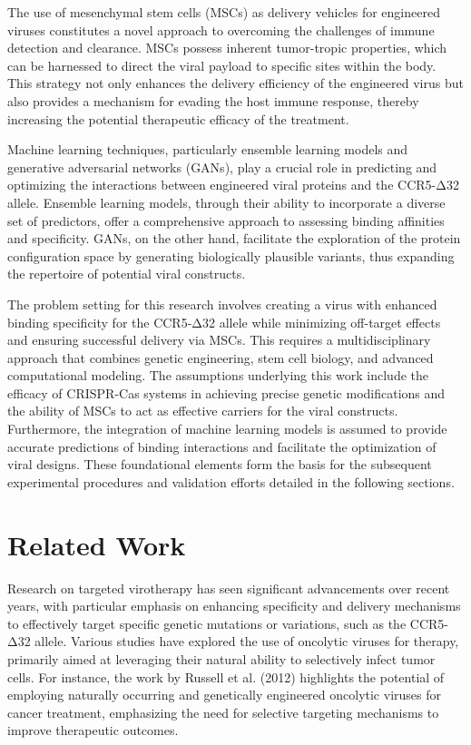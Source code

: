 \documentclass{article}
\begin{document}
The use of mesenchymal stem cells (MSCs) as delivery vehicles for engineered viruses constitutes a novel approach to overcoming the challenges of immune detection and clearance. MSCs possess inherent tumor-tropic properties, which can be harnessed to direct the viral payload to specific sites within the body. This strategy not only enhances the delivery efficiency of the engineered virus but also provides a mechanism for evading the host immune response, thereby increasing the potential therapeutic efficacy of the treatment.

Machine learning techniques, particularly ensemble learning models and generative adversarial networks (GANs), play a crucial role in predicting and optimizing the interactions between engineered viral proteins and the CCR5-Δ32 allele. Ensemble learning models, through their ability to incorporate a diverse set of predictors, offer a comprehensive approach to assessing binding affinities and specificity. GANs, on the other hand, facilitate the exploration of the protein configuration space by generating biologically plausible variants, thus expanding the repertoire of potential viral constructs.

The problem setting for this research involves creating a virus with enhanced binding specificity for the CCR5-Δ32 allele while minimizing off-target effects and ensuring successful delivery via MSCs. This requires a multidisciplinary approach that combines genetic engineering, stem cell biology, and advanced computational modeling. The assumptions underlying this work include the efficacy of CRISPR-Cas systems in achieving precise genetic modifications and the ability of MSCs to act as effective carriers for the viral constructs. Furthermore, the integration of machine learning models is assumed to provide accurate predictions of binding interactions and facilitate the optimization of viral designs. These foundational elements form the basis for the subsequent experimental procedures and validation efforts detailed in the following sections.

\section{Related Work}
Research on targeted virotherapy has seen significant advancements over recent years, with particular emphasis on enhancing specificity and delivery mechanisms to effectively target specific genetic mutations or variations, such as the CCR5-Δ32 allele. Various studies have explored the use of oncolytic viruses for therapy, primarily aimed at leveraging their natural ability to selectively infect tumor cells. For instance, the work by Russell et al. (2012) highlights the potential of employing naturally occurring and genetically engineered oncolytic viruses for cancer treatment, emphasizing the need for selective targeting mechanisms to improve therapeutic outcomes.
\end{document}
